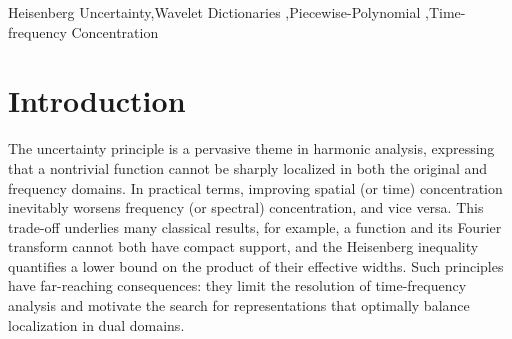 \documentclass[preprint,hidelinks,authoryear]{elsarticle}
\theoremstyle{plain}
\theoremstyle{definition}
\theoremstyle{remark}
\begin{document}
\begin{frontmatter}


\begin{keyword}
 Heisenberg Uncertainty\sep Wavelet Dictionaries \sep Piecewise-Polynomial \sep Time-frequency Concentration


\end{keyword}


\end{frontmatter}





\section{Introduction}\label{sec:intro}





The uncertainty principle is a pervasive theme in harmonic analysis, expressing that a nontrivial function cannot be sharply localized in both the original and frequency domains.  In practical terms, improving spatial (or time) concentration inevitably worsens frequency (or spectral) concentration, and vice versa.  This trade-off underlies many classical results, for example, a function and its Fourier transform cannot both have compact support, and the Heisenberg inequality quantifies a lower bound on the product of their effective widths.  Such principles have far-reaching consequences: they limit the resolution of time-frequency analysis and motivate the search for representations that optimally balance localization in dual domains.
\end{document}
